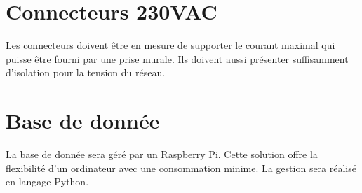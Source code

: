 \section{Connecteurs 230VAC}
Les connecteurs doivent être en mesure de supporter le courant maximal qui puisse être fourni par une prise murale. Ils doivent aussi présenter suffisamment d'isolation pour la tension du réseau.


\section{Base de donnée}
La base de donnée sera géré par un Raspberry Pi. Cette solution offre la flexibilité d'un ordinateur avec une consommation minime. La gestion sera réalisé en langage Python.

